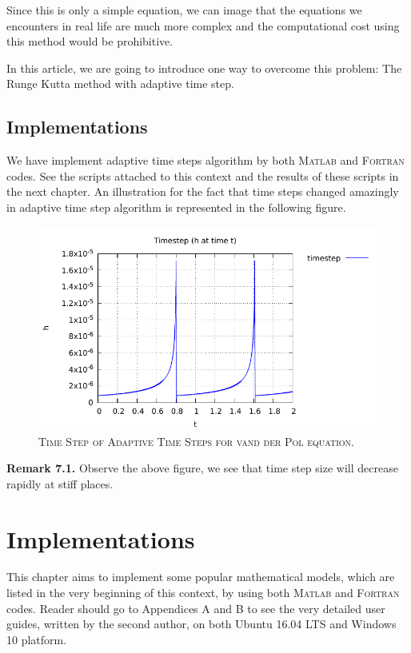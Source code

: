 \documentclass[a4paper,oneside]{book}
\numberwithin{equation}{chapter}
\begin{document}
Since this is only a simple equation, we can image that the equations we encounters in real life are much more complex and the computational cost using this method would be prohibitive.

In this article, we are going to introduce one way to overcome this problem: The Runge Kutta method with adaptive time step.


\section{Implementations}
We have implement adaptive time steps algorithm by both \textsc{Matlab} and \textsc{Fortran} codes. See the scripts attached to this context and the results of these scripts in the next chapter. An illustration for the fact that time steps changed amazingly in adaptive time step algorithm is represented in the following figure.
\begin{figure}[H]
\centering
\includegraphics[scale=1.1]{vdp_ts}
\caption{\textsc{Time Step of Adaptive Time Steps for vand der Pol equation.}}
\end{figure}
\noindent
\textbf{Remark 7.1.} Observe the above figure, we see that time step size will decrease rapidly at stiff places.

\chapter{Implementations}
This chapter aims to implement some popular mathematical models, which are listed in the very beginning of this context, by using both \textsc{Matlab} and \textsc{Fortran} codes. Reader should go to Appendices A and B to see the very detailed user guides, written by the second author, on both Ubuntu 16.04 LTS and Windows 10 platform.
\end{document}
